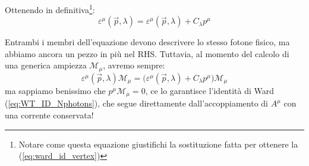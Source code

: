 \documentclass[../main.tex]{subfiles}
\begin{document}
\begin{enumerate}
    Ottenendo in definitiva\footnote{Notare come questa equazione giustifichi la sostituzione fatta per ottenere la (\ref{eq:ward_id_vertex})}:
    \begin{equation}
         \boxed{\varepsilon^\mu(\Vec{p},\lambda) = \varepsilon^\mu(\Vec{p},\lambda) + C_\lambda p^\mu}
         \label{eq:generalized_polvec}
    \end{equation}
    
    Entrambi i membri dell'equazione devono descrivere lo stesso fotone fisico, ma abbiamo ancora un pezzo in più nel RHS. Tuttavia, al momento del calcolo di una generica ampiezza $\mathscr M_\mu$, avremo sempre:
    \[
    \varepsilon^\mu(\Vec{p},\lambda)\mathscr M_\mu = \big(\varepsilon^\mu(\Vec{p},\lambda) + C_\lambda p^\mu\big)\mathscr M_\mu
    \]
    ma sappiamo benissimo che $\boxed{p^\mu \mathscr M_\mu = 0}$, ce lo garantisce l'identità di Ward (\ref{eq:WT_ID_Nphotons}), che segue direttamente dall'accoppiamento di $A^\mu$ con una corrente conservata!
\end{enumerate}
\end{document}
